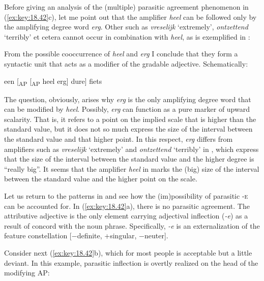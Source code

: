 \documentclass[output=paper]{langsci/langscibook}
\begin{document}
Before giving an analysis of the (multiple) parasitic agreement phenomenon in
(\ref{ex:key:18.42}c), let me point out that the amplifier \emph{heel} can be
followed only by the amplifying degree word \emph{erg}. Other  such
as \emph{vreselijk} \enquote*{extremely}, \emph{ontzettend} \enquote*{terribly}
et cetera cannot occur in combination with \emph{heel}, as is exemplified in
:

\ea%
    \label{ex:key:18.43}
\z

From the possible cooccurrence of \emph{heel} and \emph{erg} I conclude that
they form a syntactic unit that acts as a modifier of the gradable adjective.
Schematically:

\ea%
    \label{ex:key:18.44}
    een [\textsubscript{AP} [\textsubscript{AP} heel erg] dure] fiets
\z

The question, obviously, arises why \emph{erg} is the only amplifying degree
word that can be modified by \emph{heel}. Possibly, \emph{erg} can function as
a pure marker of upward scalarity. That is, it refers to a point on the implied
scale that is higher than the standard value, but it does not so much express
the size of the interval between the standard value and that higher point. In
this respect, \emph{erg} differs from amplifiers such as \emph{vreselijk}
\enquote*{extremely} and \emph{ontzettend} \enquote*{terribly} in
, which express that the size of the interval between the
standard value and the higher degree is \enquote{really big}. It seems that the
amplifier \emph{heel} in  marks the (big) size of the interval
between the standard value and the higher point on the scale.

Let us return to the patterns in  and see how the
(im)possibility of parasitic \textsc{-e} can be accounted for. In
(\ref{ex:key:18.42}a), there is no parasitic agreement. The attributive adjective is
the only element carrying adjectival inflection (\emph{-e}) as a result of
concord with the noun phrase. Specifically, \emph{-e} is an externalization of
the feature constellation [−definite, +singular, −neuter].

Consider next (\ref{ex:key:18.42}b), which for most people is acceptable but a
little deviant. In this example, parasitic inflection is overtly realized on
the head of the modifying AP:
\end{document}

